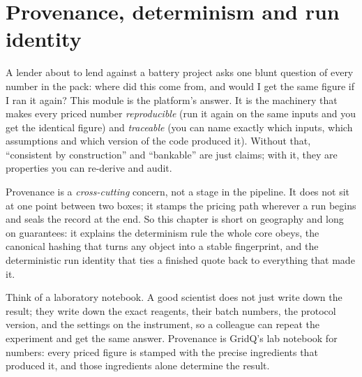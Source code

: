 \chapter{Provenance, determinism and run identity}
\label{ch:provenance}

A lender about to lend against a battery project asks one blunt question of every number in the pack: where did this come from, and would I get the same figure if I ran it again? This module is the platform's answer. It is the machinery that makes every priced number \emph{reproducible} (run it again on the same inputs and you get the identical figure) and \emph{traceable} (you can name exactly which inputs, which assumptions and which version of the code produced it). Without that, ``consistent by construction'' and ``bankable'' are just claims; with it, they are properties you can re-derive and audit.

Provenance is a \emph{cross-cutting} concern, not a stage in the pipeline. It does not sit at one point between two boxes; it stamps the pricing path wherever a run begins and seals the record at the end. So this chapter is short on geography and long on guarantees: it explains the determinism rule the whole core obeys, the canonical hashing that turns any object into a stable fingerprint, and the deterministic run identity that ties a finished quote back to everything that made it.

\begin{plainnote}
Think of a laboratory notebook. A good scientist does not just write down the result; they write down the exact reagents, their batch numbers, the protocol version, and the settings on the instrument, so a colleague can repeat the experiment and get the same answer. Provenance is GridQ's lab notebook for numbers: every priced figure is stamped with the precise ingredients that produced it, and those ingredients alone determine the result.
\end{plainnote}


